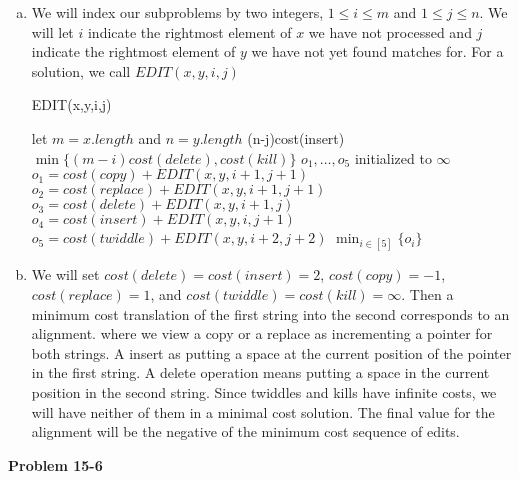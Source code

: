 \documentclass{article}
\begin{document}
\begin{enumerate}[a.]
\item
We will index our subproblems by two integers, $1\le i \le m$ and $1\le j\le n$. We will let $i$ indicate the rightmost element of $x$ we have not processed and $j$ indicate the rightmost element of $y$ we have not yet found matches for. For a solution, we call $EDIT(x,y,i,j)$
\begin{algorithm}
\caption{EDIT(x,y,i,j)}
\begin{algorithmic}
\State let $m = x.length$ and $n = y.length$
\State \Return (n-j)cost(insert) 
\EndIf
{}
\State \Return $\min\{(m-i)cost(delete),cost(kill)\}$
\EndIf
\State $o_1, \ldots, o_5$ initialized to $\infty$
\State $o_1 = cost(copy) + EDIT(x,y,i+1,j+1)$
\EndIf
\State $o_2 = cost(replace) + EDIT(x,y,i+1,j+1)$
\State $o_3 = cost(delete) + EDIT(x,y,i+1,j)$
\State $o_4 = cost(insert) + EDIT(x,y,i,j+1)$
\State $o_5 = cost(twiddle) + EDIT(x,y,i+2,j+2)$
\EndIf
\EndIf
\State \Return $\min_{i\in [5]}\{o_i\}$
\end{algorithmic}
\end{algorithm}

\item
We will set $cost(delete) = cost(insert) = 2$, $cost(copy) = -1$, $cost(replace) = 1$, and $cost(twiddle) =cost(kill) = \infty$. Then a minimum cost translation of the first string into the second corresponds to an alignment. where we view a copy or a replace as incrementing a pointer for both strings. A insert as putting a space at the current position of the pointer in the first string. A delete operation means putting a space in the current position in the second string. Since twiddles and kills have infinite costs, we will have neither of them in a minimal cost solution. The final value for the alignment will be the negative of the minimum cost sequence of edits.
\end{enumerate}

\noindent\textbf{Problem 15-6}\\
\end{document}
